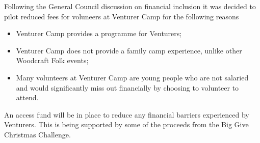 Following the General Council discussion on financial inclusion it was decided to pilot reduced fees for voluneers at Venturer Camp for the following reasons
\begin{itemize}
    \item Venturer Camp provides a programme for Venturers;
    \item Venturer Camp does not provide a family camp experience, unlike other Woodcraft Folk events;
    \item Many volunteers at Venturer Camp are young people who are not salaried and would significantly miss out financially by choosing to volunteer to attend.
\end{itemize}

An access fund will be in place to reduce any financial barriers experienced by Venturers. This is being supported by some of the proceeds from the Big Give Christmas Challenge.